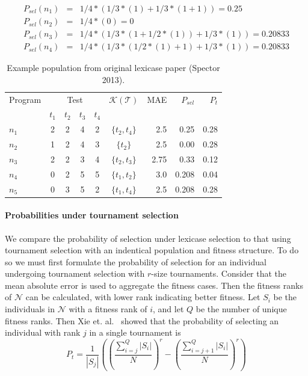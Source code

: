 \documentclass[preprint]{article}
\begin{document}
\begin{align*}
P_{sel}(n_1) &=& 1/4*(1/3*(1)+1/3*(1+1)) = 0.25 \\
P_{sel}(n_2) &=& 1/4*(0) = 0 \\
P_{sel}(n_3) &=&1/4*(1/3*(1+1/2*(1))+1/3*(1)) = 0.20833 \\
P_{sel}(n_4) &=& 1/4*(1/3*(1/2*(1)+1)+1/3*(1)) = 0.20833 
\end{align*}

\begin{table}
\centering
\caption{Example population from original lexicase paper (Spector 2013).}\label{tbl:ex}
\begin{tabular}{l|cccc|c|r|rr}
Program & \multicolumn{4}{c}{Test} & $\mathcal{K}(\mathcal{T})$ & MAE & $P_{sel}$ & $P_{t}$\\
& $t_1$ & $t_2$ & $t_3$ & $t_4$ & \\ \hline
$n_1$ & 2 & 2 & 4 & 2 & $\{t_2,t_4\}$ &	2.5		&	0.25 	& 	0.28	\\
$n_2$ & 1 & 2 & 4 & 3 & $\{t_2\}$		&	2.5		&	0.00	&	0.28	\\
$n_3$ & 2 & 2 & 3 & 4 & $\{t_2,t_3\}$ &	2.75	& 	0.33	&	0.12	\\
$n_4$ & 0 & 2 & 5 & 5 & $\{t_1,t_2\}$ &	3.0		& 	0.208	&	0.04	\\
$n_5$ & 0 & 3 & 5 & 2 & $\{t_1,t_4\}$ &	2.5		&	0.208	&	0.28
\end{tabular}
\end{table}

\paragraph{Probabilities under tournament selection} We compare the probability of selection under lexicase selection to that using tournament selection with an indentical population and fitness structure. To do so we must first formulate the probability of selection for an individual undergoing tournament selection with $r$-size tournaments. Consider that the mean absolute error is used to aggregate the fitness cases. Then the fitness ranks of $\mathcal{N}$ can be calculated, with lower rank indicating better fitness. Let $S_i$ be the individuals in $\mathcal{N}$ with a fitness rank of $i$, and let $Q$ be the number of unique fitness ranks. Then Xie et. al.~\cite{xie_another_2007} showed that the probability of selecting an individual with rank $j$ in a single tournament is 
\begin{equation}
P_t = \frac{1}{|S_j|}\left( \left(\frac{\sum_{i=j}^Q{|S_i|}}{N}\right)^r - \left(\frac{\sum_{i=j+1}^Q{|S_i|}}{N}\right)^r \right)
\end{equation}
\end{document}
